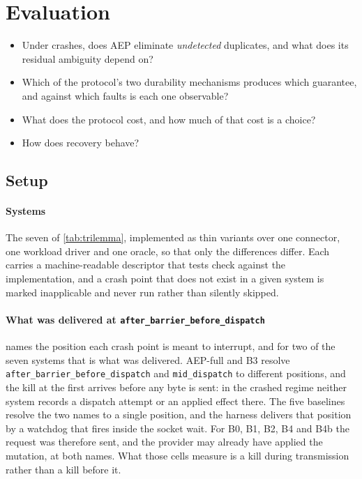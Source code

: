 \section{Evaluation}
\label{sec:evaluation}

\begin{itemize}
\item[\textbf{RQ1}] Under crashes, does AEP eliminate \emph{undetected}
      duplicates, and what does its residual ambiguity depend on?
\item[\textbf{RQ2}] Which of the protocol's two durability mechanisms produces
      which guarantee, and against which faults is each one observable?
\item[\textbf{RQ3}] What does the protocol cost, and how much of that cost is
      a choice?
\item[\textbf{RQ4}] How does recovery behave?
\end{itemize}

\subsection{Setup}
\label{sec:eval-setup}

\paragraph{Systems} The seven of \cref{tab:trilemma}, implemented as thin
variants over one connector, one workload driver and one oracle, so that only
the differences differ. Each carries a machine-readable descriptor that tests
check against the implementation, and a crash point that does not exist in a
given system is marked inapplicable and never run rather than silently skipped.

\paragraph{What was delivered at \texttt{after\_barrier\_before\_dispatch}}
 names the position each crash point is meant to
interrupt, and for two of the seven systems that is what was delivered.
AEP-full and B3 resolve \texttt{after\_barrier\_before\_dispatch} and
\texttt{mid\_dispatch} to different positions, and the kill at the first
arrives before any byte is sent: in the crashed regime neither system records
a dispatch attempt or an applied effect there. The five baselines resolve the
two names to a single position, and the harness delivers that position by a
watchdog that fires inside the socket wait. For B0, B1, B2, B4 and B4b the
request was therefore sent, and the provider may already have applied the
mutation, at both names. What those cells measure is a kill during
transmission rather than a kill before it.

